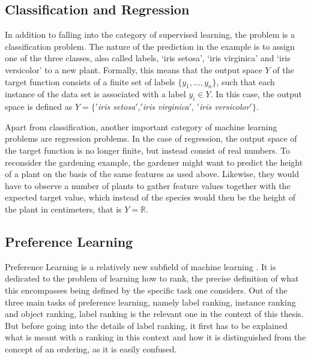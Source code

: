 \subsection{Classification and Regression}
In addition to falling into the category of supervised learning, the problem is a classification problem. The nature of the prediction in the example is to assign one of the three classes, also called labels, `iris setosa', `iris virginica' and `iris versicolor' to a new plant. Formally, this means that the output space $Y$ of the target function consists of a finite set of labels $\lbrace y_1,\dots,y_n\rbrace$, such that each instance of the data set is associated with a label $y_i \in Y$. In this case, the output space is defined as $Y=\lbrace '$\textit{iris setosa}$'$,$'$\textit{iris virginica}$'$, $'$\textit{iris versicolor}$' \rbrace $. 

Apart from classification, another important category of machine learning problems are regression problems. In the case of regression, the output space of the target function is no longer finite, but instead consist of real numbers. To reconsider the gardening example, the gardener might want to predict the height of a plant on the basis of the same features as used above. Likewise, they would have to observe a number of plants to gather feature values together with the expected target value, which instead of the species would then be the height of the plant in centimeters, that is $Y=\mathbb{R}$.

\subsection{Preference Learning}
Preference Learning is a relatively new subfield of machine learning \cite{DBLP:books/daglib/0025729}. It is dedicated to the problem of learning how to rank, the precise definition of what this encompasses being defined by the specific task one considers. Out of the three main tasks of preference learning, namely label ranking, instance ranking and object ranking, label ranking is the relevant one in the context of this thesis. But before going into the details of label ranking, it first has to be explained what is meant with a ranking in this context and how it is distinguished from the concept of an ordering, as it is easily confused.

